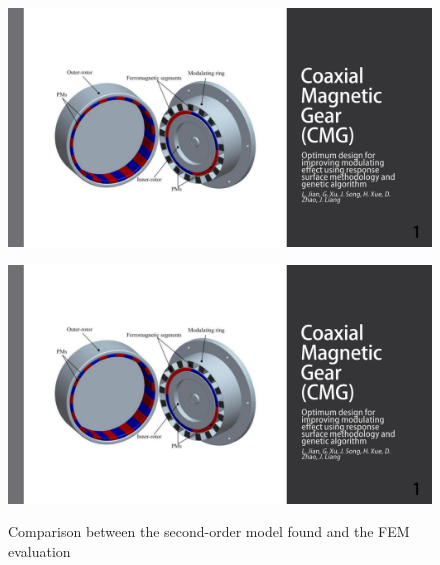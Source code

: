 \begin{figure}[H]
    \begin{minipage}{.48\linewidth}
    \centering
        \includegraphics[page={59},width=\textwidth]{LELEC2311.allow.pdf}
    \end{minipage}
    \hfill%
    \begin{minipage}[c]{.48\linewidth}
        \centering
        \includegraphics[page={60},width=\textwidth]{LELEC2311.allow.pdf}
        \label{fig:60_th slide}
    \end{minipage}
    \caption{Comparison between the second-order model found and the FEM evaluation}
\end{figure}


